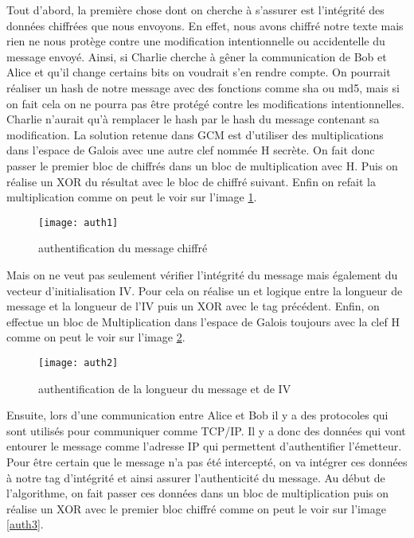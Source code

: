 Tout d'abord, la première chose dont on cherche à s'assurer est l'intégrité des données chiffrées que nous envoyons. En effet, nous avons chiffré notre texte mais rien ne nous protège contre une modification intentionnelle ou accidentelle du message envoyé. Ainsi, si Charlie cherche à gêner la communication de Bob et Alice et qu'il change certains bits on voudrait s'en rendre compte. On pourrait réaliser un hash de notre message avec des fonctions comme sha ou md5, mais si on fait cela on ne pourra pas être protégé contre les modifications intentionnelles. Charlie n'aurait qu'à remplacer le hash par le hash du message contenant sa modification. La solution retenue dans GCM est d'utiliser des multiplications dans l'espace de Galois avec une autre clef nommée H secrète. On fait donc passer le premier bloc de chiffrés dans un bloc de multiplication avec H. Puis on réalise un XOR du résultat avec le bloc de chiffré suivant. Enfin on refait la multiplication comme on peut le voir sur l'image \ref{auth1}.

\begin{figure}[!h]
  \centering
  \texttt{[image: auth1]}
  \caption{authentification du message chiffré}
  \label{auth1}
\end{figure}


Mais on ne veut pas seulement vérifier l'intégrité du message mais également du vecteur d'initialisation IV. Pour cela on réalise un \og et\fg{} logique entre la longueur de message et la longueur de l'IV
puis un XOR avec le tag précédent. Enfin, on effectue un bloc de Multiplication dans l'espace de Galois toujours avec la clef H comme on peut le voir sur l'image \ref{auth2}.

\begin{figure}[!h]
  \centering
  \texttt{[image: auth2]}
  \caption{authentification de la longueur du message et de IV}
  \label{auth2}
\end{figure}


Ensuite, lors d'une communication entre Alice et Bob il y a des protocoles qui sont utilisés pour communiquer comme TCP/IP. Il y a donc des données qui vont entourer le message comme l'adresse IP qui permettent d'authentifier l'émetteur. Pour être certain que le message n'a pas été intercepté, on va intégrer ces données à notre tag d'intégrité et ainsi assurer l'authenticité du message. 
Au début de l'algorithme, on fait passer ces données dans un bloc de multiplication puis on réalise un XOR avec le premier bloc chiffré comme on peut le voir sur l'image \ref{auth3}.

